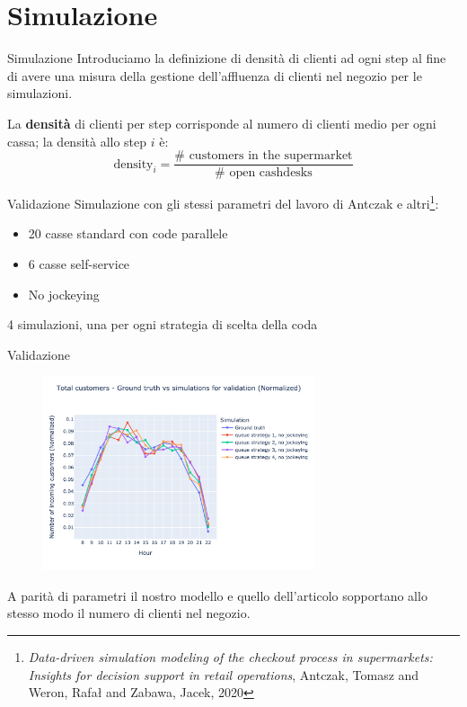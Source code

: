 \section{Simulazione}
\begin{frame}{Simulazione}
	Introduciamo la definizione di densità di clienti ad ogni step al fine di avere una misura della gestione dell'affluenza di clienti nel negozio per le simulazioni.
	
	La \textbf{densità} di clienti per step corrisponde al numero di clienti medio per ogni cassa; la densità allo step $i$ è:
	\[\text{density}_i = \frac{\# \text{ customers in the supermarket}}{\# \text{ open cashdesks}}\]

\end{frame}

\begin{frame}{Validazione}
	Simulazione con gli stessi parametri del lavoro di Antczak e altri\footnote{\textit{Data-driven simulation modeling of the checkout process in supermarkets: Insights for decision support in retail operations}, Antczak, Tomasz and Weron, Rafał and Zabawa, Jacek, 2020}: 
	\begin{itemize}
		\item 20 casse standard con code parallele
		\item 6 casse self-service
		\item No jockeying
	\end{itemize}	
	4 simulazioni, una per ogni strategia di scelta della coda
\end{frame}

\begin{frame}{Validazione}
	\begin{figure}[H]
		\centering
		\includegraphics[width=8cm]{"../report/images/results/total_customers_validation.png"}
	\end{figure}
	A parità di parametri il nostro modello e quello dell'articolo sopportano allo stesso modo il numero di clienti nel negozio.
\end{frame}

